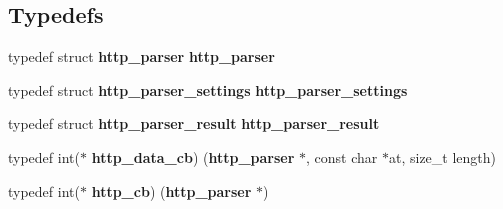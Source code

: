 \subsection*{Typedefs}
\begin{DoxyCompactItemize}
\item 
typedef struct {\bf http\+\_\+parser} {\bf http\+\_\+parser}
\item 
typedef struct {\bf http\+\_\+parser\+\_\+settings} {\bf http\+\_\+parser\+\_\+settings}
\item 
typedef struct {\bf http\+\_\+parser\+\_\+result} {\bf http\+\_\+parser\+\_\+result}
\item 
typedef int($\ast$ {\bf http\+\_\+data\+\_\+cb}) ({\bf http\+\_\+parser} $\ast$, const char $\ast$at, size\+\_\+t length)
\item 
typedef int($\ast$ {\bf http\+\_\+cb}) ({\bf http\+\_\+parser} $\ast$)
\end{DoxyCompactItemize}
